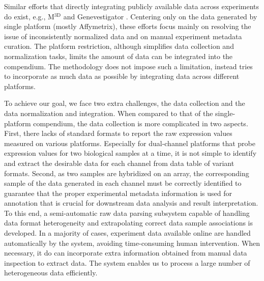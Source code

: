 Similar efforts that directly integrating publicly available data across
experiments do exist, e.g., M$^{\textrm{3D}}$ \cite{Faith2008} and
Genevestigator \cite{Hruz2008}.
%
Centering only on the data generated by single platform (mostly
Affymetrix), these efforts focus mainly on resolving the issue of
inconsistently normalized data and on manual experiment metadata curation.
%
The platform restriction, although simplifies data collection and
normalization tasks, limits the amount of data can be integrated into the
compendium.
The methodology does not impose such a limitation, instead tries to
incorporate as much data as possible by integrating data across different
platforms.

To achieve our goal, we face two extra challenges, the data collection and
the data normalization and integration.
%
When compared to that of the single-platform compendium, the data
collection is more complicated in two aspects.
%
First, there lacks of standard formats to report the raw expression values
measured on various platforms.  Especially for dual-channel platforms that
probe expression values for two biological samples at a time, it is not
simple to identify and extract the desirable data for each channel from
data table of variant formats.
%
Second, as two samples are hybridized on an array, the corresponding sample
of the data generated in each channel must be correctly identified to
guarantee that the proper experimental metadata information is used for
annotation that is crucial for downstream data analysis and result
interpretation.
%
To this end, a semi-automatic raw data parsing subsystem capable of
handling data format heterogeneity and extrapolating correct data sample
associations is developed.
%
In a majority of cases, experiment data available online are handled
automatically by the system, avoiding time-consuming human intervention.
%
When necessary, it do can incorporate extra information obtained from
manual data inspection to extract data.
%
The system enables us to process a large number of heterogeneous data
efficiently.


